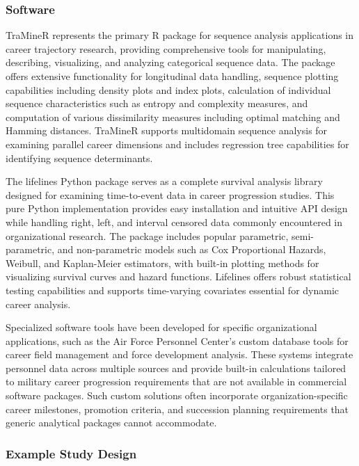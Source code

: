 \documentclass[main.tex]{subfiles}
\begin{document}
\subsubsection{Software}

TraMineR represents the primary R package for sequence analysis applications in career trajectory research, providing comprehensive tools for manipulating, describing, visualizing, and analyzing categorical sequence data. The package offers extensive functionality for longitudinal data handling, sequence plotting capabilities including density plots and index plots, calculation of individual sequence characteristics such as entropy and complexity measures, and computation of various dissimilarity measures including optimal matching and Hamming distances. TraMineR supports multidomain sequence analysis for examining parallel career dimensions and includes regression tree capabilities for identifying sequence determinants\parencite{traminer2024}.

The lifelines Python package serves as a complete survival analysis library designed for examining time-to-event data in career progression studies. This pure Python implementation provides easy installation and intuitive API design while handling right, left, and interval censored data commonly encountered in organizational research. The package includes popular parametric, semi-parametric, and non-parametric models such as Cox Proportional Hazards, Weibull, and Kaplan-Meier estimators, with built-in plotting methods for visualizing survival curves and hazard functions. Lifelines offers robust statistical testing capabilities and supports time-varying covariates essential for dynamic career analysis\parencite{lifelines2024}.

Specialized software tools have been developed for specific organizational applications, such as the Air Force Personnel Center's custom database tools for career field management and force development analysis. These systems integrate personnel data across multiple sources and provide built-in calculations tailored to military career progression requirements that are not available in commercial software packages. Such custom solutions often incorporate organization-specific career milestones, promotion criteria, and succession planning requirements that generic analytical packages cannot accommodate\parencite{afpc2005}.

\subsubsection{Example Study Design}
\end{document}
